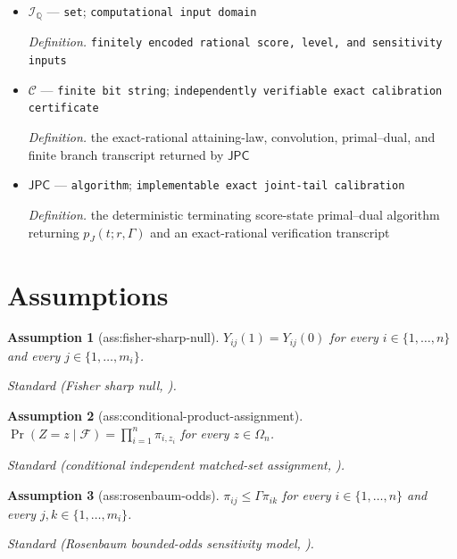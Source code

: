 \documentclass{article}
\newtheorem{assumption}{Assumption}
\begin{document}
\begin{itemize}
  \item \(\mathcal I_{\mathbb Q}\) --- \texttt{set}; \texttt{computational input domain}
  \par\smallskip\noindent\emph{Definition.} \texttt{finitely encoded rational score,\allowbreak{} level,\allowbreak{} and sensitivity inputs}
  \item \(\mathcal C\) --- \texttt{finite bit string}; \texttt{independently verifiable exact calibration certificate}
  \par\smallskip\noindent\emph{Definition.} the exact-rational attaining-law, convolution, primal--dual, and finite branch transcript returned by \(\mathsf{JPC}\)
  \item \(\mathsf{JPC}\) --- \texttt{algorithm}; \texttt{implementable exact joint-\allowbreak{}tail calibration}
  \par\smallskip\noindent\emph{Definition.} the deterministic terminating score-state primal--dual algorithm returning \(p_J(t;r,\Gamma)\) and an exact-rational verification transcript
\end{itemize}

\section{Assumptions}

\begin{assumption}[ass:fisher-sharp-null]\label{ass:fisher-sharp-null}
\(Y_{ij}(1)=Y_{ij}(0)\) for every \(i\in\{1,\ldots,n\}\) and every \(j\in\{1,\ldots,m_i\}\).
\par\smallskip\noindent\emph{Standard} (Fisher sharp null, \cite{Rosenbaum1987SensitivityPermutation}).
\end{assumption}

\begin{assumption}[ass:conditional-product-assignment]\label{ass:conditional-product-assignment}
\(\Pr(Z=z\mid\mathcal F)=\prod_{i=1}^n\pi_{i,z_i}\) for every \(z\in\Omega_n\).
\par\smallskip\noindent\emph{Standard} (conditional independent matched-set assignment, \cite{Rosenbaum2018Stratified}).
\end{assumption}

\begin{assumption}[ass:rosenbaum-odds]\label{ass:rosenbaum-odds}
\(\pi_{ij}\le\Gamma\pi_{ik}\) for every \(i\in\{1,\ldots,n\}\) and every \(j,k\in\{1,\ldots,m_i\}\).
\par\smallskip\noindent\emph{Standard} (Rosenbaum bounded-odds sensitivity model, \cite{Rosenbaum1987SensitivityPermutation}).
\end{assumption}
\end{document}
